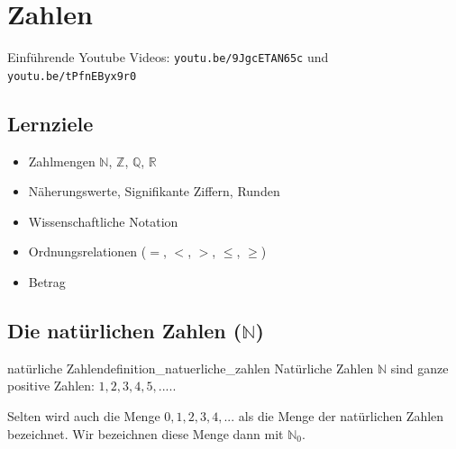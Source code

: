 
\section{Zahlen}

Einführende Youtube Videos: \texttt{youtu.be/9JgcETAN65c} und \texttt{youtu.be/tPfnEByx9r0}

\subsection*{Lernziele}

\begin{itemize}
	\item Zahlmengen $\mathbb{N}$, $\mathbb{Z}$, $\mathbb{Q}$, $\mathbb{R}$
  \item Näherungswerte, Signifikante Ziffern, Runden
  \item Wissenschaftliche Notation
  \item Ordnungsrelationen ($=$, $<$, $>$, $\leq$, $\geq$)
  \item Betrag
\end{itemize}


\subsection{Die natürlichen Zahlen ($\mathbb{N}$)}

\begin{definition}{natürliche Zahlen}{definition_natuerliche_zahlen}
  Natürliche Zahlen $\mathbb{N}$ sind ganze positive Zahlen: ${1, 2, 3, 4, 5, ....}$.
\end{definition}

\begin{bemerkung}{}{}
  Selten wird auch die Menge ${0, 1, 2, 3, 4, ...}$ als die Menge
  der natürlichen Zahlen bezeichnet. Wir bezeichnen diese Menge dann mit $\mathbb{N}_0$.


\end{bemerkung}
\newpage


